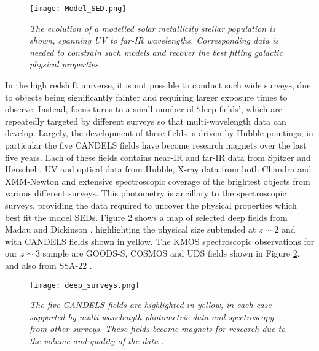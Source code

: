 \documentclass{literature}
\begin{document}
\begin{figure}[!htp]
\centering
\texttt{[image: Model\_SED.png]}
\caption{\footnotesize{\emph{The evolution of a modelled solar metallicity stellar population is shown, spanning UV to far-IR wavelengths. Corresponding data is needed to constrain such models and recover the best fitting galactic physical properties \citep{Bruzual2003}}}}
\label{fig:mod_sed}
\end{figure}



In the high redshift universe, it is not possible to conduct such wide surveys, due to objects being significantly fainter and requiring larger exposure times to observe. Instead, focus turns to a small number of `deep fields', which are repeatedly targeted by different surveys so that multi-wavelength data can develop. Largely, the development of these fields is driven by Hubble pointings; in particular the five CANDELS fields \citep{Grogin2011} have become research magnets over the last five years. Each of these fields contains near-IR and far-IR data from Spitzer \citep{Werner2004} and Herschel \citep{Pilbratt2010}, UV and optical data from Hubble, X-ray data from both Chandra \citep{Giacconi2001} and XMM-Newton \citep{Jansen2001} and extensive spectroscopic coverage of the brightest objects from various different surveys. This photometry is ancillary to the spectroscopic surveys, providing the data required to uncover the physical properties which best fit the mdoel SEDs. Figure \ref{fig:deep_surveys} shows a map of selected deep fields from Madau and Dickinson \citep{Madau_2014}, highlighting the physical size subtended at $z\sim 2$ and with CANDELS fields shown in yellow. The KMOS spectroscopic observations for our $z \sim 3$ sample are GOODS-S, COSMOS and UDS fields shown in Figure \ref{fig:deep_surveys}, and also from SSA-22 \citep{Lehmer2009}. \\ 

\begin{figure}[!htp]
\centering
\texttt{[image: deep\_surveys.png]}
\caption{\footnotesize{\emph{The five CANDELS fields are highlighted in yellow, in each case supported by multi-wavelength photometric data and spectroscopy from other surveys. These fields become magnets for research due to the volume and quality of the data \citep{Madau_2014}.}}}
\label{fig:deep_surveys}
\end{figure} 
\end{document}
